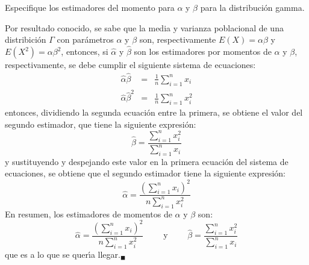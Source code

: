 \begin{enunciado}
 Especifique los estimadores del momento para $\alpha$ y $\beta$ para la distribuci\'on gamma.
\end{enunciado}

\begin{solucion}
 Por resultado conocido, se sabe que la media y varianza poblacional de una distribici\'on $\Gamma$ con par\'ametros $\alpha$ y $\beta$ son, respectivamente $E(X) = \alpha\beta$ y $E\left( X^2 \right) = \alpha\beta^2$, entonces, si $\widehat{\alpha}$ y $\widehat{\beta}$ son los estimadores por momentos de $\alpha$ y $\beta$, respectivamente, se debe cumplir el siguiente sistema de ecuaciones:
 \begin{eqnarray*}
  \widehat{\alpha}\widehat{\beta} & = & \frac{1}{n} \sum_{i=1}^n x_i \\
  \widehat{ \alpha} \widehat{\beta}^2 & = & \frac{1}{n} \sum_{i=1}^n x_i^2
 \end{eqnarray*}
 entonces, dividiendo la segunda ecuaci\'on entre la primera, se obtiene el valor del segundo estimador, que tiene la siguiente expresi\'on:
 \begin{equation*}
  \widehat{\beta} = \frac{\sum_{i=1}^n x_i^2}{\sum_{i=1}^n x_i}
 \end{equation*}
 y sustituyendo y despejando este valor en la primera ecuaci\'on del sistema de ecuaciones, se obtiene que el segundo estimador tiene la siguiente expresi\'on:
 \begin{equation*}
  \widehat{\alpha } = \frac{\left( \sum_{i=1}^n x_i \right)^2}{n\sum_{i=1}^n x_i^2}
 \end{equation*}
 En resumen, los estimadores de momentos de $\alpha$ y $\beta$ son:
 \begin{equation*}
  \widehat{\alpha} = \frac{\displaystyle{ \left( \sum_{i=1}^n x_i \right)^2 }}{\displaystyle{n\sum_{i=1}^n x_i^2}} \qquad \text{ y  } \qquad
  \widehat{\beta} = \frac{\displaystyle{ \sum_{i=1}^n x_i^2 }}{\displaystyle{ \sum_{i=1}^n x_i }}  
 \end{equation*}
 que es a lo que se quer\'{\i}a llegar.${}_{\blacksquare}$
\end{solucion}
